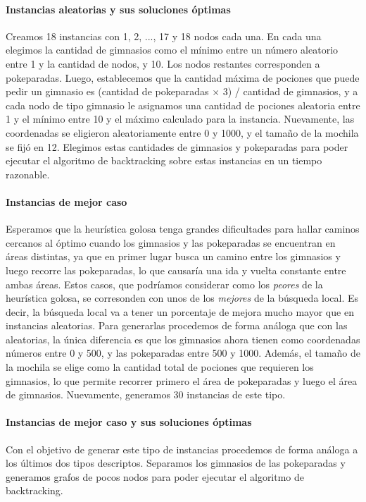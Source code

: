\paragraph{Instancias aleatorias y sus soluciones \'optimas}
Creamos 18 instancias con 1, 2, ..., 17 y 18 nodos cada una. En cada una elegimos la cantidad de gimnasios como el m\'inimo entre un n\'umero aleatorio entre 1 y la cantidad de nodos, y 10. Los nodos restantes corresponden a pokeparadas. Luego, establecemos que la cantidad m\'axima de pociones que puede pedir un gimnasio es (cantidad de pokeparadas $\times$ 3) / cantidad de gimnasios, y a cada nodo de tipo gimnasio le asignamos una cantidad de pociones aleatoria entre 1 y el m\'inimo entre 10 y el m\'aximo calculado para la instancia. Nuevamente, las coordenadas se eligieron aleatoriamente entre 0 y 1000, y el tamaño de la mochila se fij\'o en 12. Elegimos estas cantidades de 
gimnasios y pokeparadas para poder ejecutar el algoritmo de backtracking sobre estas instancias en un tiempo razonable.

\paragraph{Instancias de mejor caso}
Esperamos que la heur\'istica golosa tenga grandes dificultades para hallar caminos cercanos al \'optimo cuando los gimnasios y las pokeparadas se encuentran en \'areas distintas, ya que en primer lugar busca un camino entre los gimnasios y luego recorre las pokeparadas, lo que causar\'ia una ida y vuelta constante entre ambas \'areas. Estos casos, que podr\'iamos considerar como los \textit{peores} de la heur\'istica golosa, se corresonden con unos de los \textit{mejores} de la b\'usqueda local. Es decir, la b\'usqueda local va a tener un porcentaje de mejora mucho mayor que en instancias aleatorias. Para generarlas procedemos de forma an\'aloga que con las aleatorias, la \'unica diferencia es que los gimnasios ahora tienen como coordenadas n\'umeros entre 0 y 500, y las pokeparadas entre 500 y 1000. Adem\'as, el tamaño de la mochila se elige como la cantidad total de pociones que requieren los gimnasios, lo que permite recorrer primero el \'area de pokeparadas y luego el \'area de gimnasios. Nuevamente, generamos 30 instancias de este tipo.

\paragraph{Instancias de mejor caso y sus soluciones \'optimas}
Con el objetivo de generar este tipo de instancias procedemos de forma an\'aloga a los \'ultimos dos tipos descriptos. Separamos los gimnasios de las pokeparadas y generamos grafos de pocos nodos para poder ejecutar el algoritmo de backtracking.

